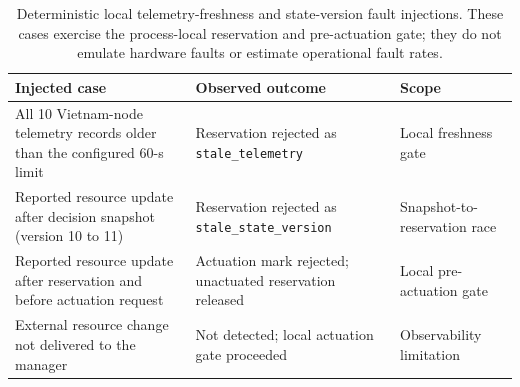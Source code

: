 \documentclass[final,5p]{elsarticle}
\begin{document}
\begin{table}[p]
\centering
\caption{Deterministic local telemetry-freshness and state-version fault injections. These cases exercise the process-local reservation and pre-actuation gate; they do not emulate hardware faults or estimate operational fault rates.}
\label{tab:telemetry_fault_injection}
\scriptsize
\begin{tabular}{p{}p{}p{}}
\toprule
Injected case & Observed outcome & Scope \\
\midrule
All 10 Vietnam-node telemetry records older than the configured 60-s limit & Reservation rejected as \texttt{stale\_telemetry} & Local freshness gate \\
Reported resource update after decision snapshot (version 10 to 11) & Reservation rejected as \texttt{stale\_state\_version} & Snapshot-to-reservation race \\
Reported resource update after reservation and before actuation request & Actuation mark rejected; unactuated reservation released & Local pre-actuation gate \\
External resource change not delivered to the manager & Not detected; local actuation gate proceeded & Observability limitation \\
\bottomrule
\end{tabular}
\end{table}
\clearpage


\end{document}
